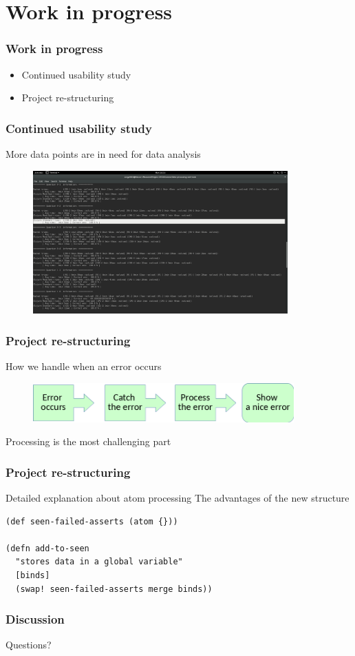 \documentclass{beamer}
\begin{document}
\section{Work in progress}

\begin{frame}
  \frametitle{Work in progress}
\begin{itemize}
\item Continued usability study 
\item Project re-structuring
\end{itemize}
\end{frame}

\begin{frame}
  \frametitle{Continued usability study }
More data points are in need for data analysis
\begin{figure}
\includegraphics[height=55mm]{one-cut.png}
\end{figure}
\end{frame}


\begin{frame}
  \frametitle{Project re-structuring}
How we handle when an error occurs 
\begin{figure}
\includegraphics[height=15mm]{Step.png}
\end{figure}
\alert{Processing} is the most challenging part
\end{frame}


\begin{frame}[fragile]
  \frametitle{Project re-structuring}
Detailed explanation about atom processing
The advantages of the new structure
\begin{verbatim}
(def seen-failed-asserts (atom {}))

(defn add-to-seen
  "stores data in a global variable"
  [binds]
  (swap! seen-failed-asserts merge binds))
\end{verbatim}
\end{frame}

\begin{frame}
  \frametitle{Discussion}
Questions?
\end{frame}
\end{document}
